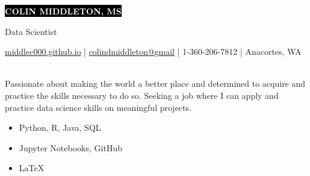 \documentclass[11pt]{developercv} %
\begin{document}
\setlength{\abovedisplayskip}{0pt}
\setlength{\belowdisplayskip}{0pt}

\colorbox{black}{{\HUGE\textcolor{white}{\textbf{\MakeUppercase{Colin Middleton, MS}}}}}

\vspace{6pt}

{\huge Data Scientist} %

\vspace{0.25cm}

\begin{center}
	\href{https://middlec000.github.io/}{middlec000.github.io}
	\hspace{0.25cm} | \hspace{0.25cm}
	\href{mailto:colindmiddleton@gmail.com}{colindmiddleton@gmail}
	\hspace{0.25cm} | \hspace{0.25cm}
	1-360-206-7812
	\hspace{0.25cm} | \hspace{0.25cm}
	Anacortes, WA
\end{center}

\vspace{0.25cm}


\begin{minipage}[t]{0.5\textwidth} %
	 \\
	Passionate about making the world a better place and determined to acquire and practice the skills necessary to do so. Seeking a job where I can apply and practice data science skills on meaningful projects. 
\end{minipage}
\hfill %
\begin{minipage}[t]{0.4\textwidth}
	\begin{itemize}
		\item Python, R, Java, SQL
		\item Jupyter Notebooks, GitHub
	   	\item LaTeX
	\end{itemize}
\end{minipage}
\end{document}
